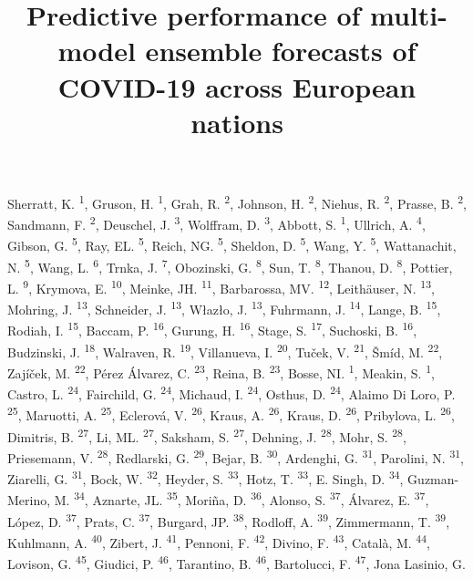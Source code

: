 \documentclass[
]{article}
\title{Predictive performance of multi-model ensemble forecasts of COVID-19 across European nations}
\author{}
\date{\vspace{-2.5em}}
\begin{document}
\maketitle

Sherratt, K. \textsuperscript{1}, Gruson, H. \textsuperscript{1}, Grah, R. \textsuperscript{2}, Johnson, H. \textsuperscript{2}, Niehus, R. \textsuperscript{2}, Prasse, B. \textsuperscript{2}, Sandmann, F. \textsuperscript{2}, Deuschel, J. \textsuperscript{3}, Wolffram, D. \textsuperscript{3}, Abbott, S. \textsuperscript{1}, Ullrich, A. \textsuperscript{4}, Gibson, G. \textsuperscript{5}, Ray, EL. \textsuperscript{5}, Reich, NG. \textsuperscript{5}, Sheldon, D. \textsuperscript{5}, Wang, Y. \textsuperscript{5}, Wattanachit, N. \textsuperscript{5}, Wang, L. \textsuperscript{6}, Trnka, J. \textsuperscript{7}, Obozinski, G. \textsuperscript{8}, Sun, T. \textsuperscript{8}, Thanou, D. \textsuperscript{8}, Pottier, L. \textsuperscript{9}, Krymova, E. \textsuperscript{10}, Meinke, JH. \textsuperscript{11}, Barbarossa, MV. \textsuperscript{12}, Leithäuser, N. \textsuperscript{13}, Mohring, J. \textsuperscript{13}, Schneider, J. \textsuperscript{13}, Włazło, J. \textsuperscript{13}, Fuhrmann, J. \textsuperscript{14}, Lange, B. \textsuperscript{15}, Rodiah, I. \textsuperscript{15}, Baccam, P. \textsuperscript{16}, Gurung, H. \textsuperscript{16}, Stage, S. \textsuperscript{17}, Suchoski, B. \textsuperscript{16}, Budzinski, J. \textsuperscript{18}, Walraven, R. \textsuperscript{19}, Villanueva, I. \textsuperscript{20}, Tuček, V. \textsuperscript{21}, Šmíd, M. \textsuperscript{22}, Zajíček, M. \textsuperscript{22}, Pérez Álvarez, C. \textsuperscript{23}, Reina, B. \textsuperscript{23}, Bosse, NI. \textsuperscript{1}, Meakin, S. \textsuperscript{1}, Castro, L. \textsuperscript{24}, Fairchild, G. \textsuperscript{24}, Michaud, I. \textsuperscript{24}, Osthus, D. \textsuperscript{24}, Alaimo Di Loro, P. \textsuperscript{25}, Maruotti, A. \textsuperscript{25}, Eclerová, V. \textsuperscript{26}, Kraus, A. \textsuperscript{26}, Kraus, D. \textsuperscript{26}, Pribylova, L. \textsuperscript{26}, Dimitris, B. \textsuperscript{27}, Li, ML. \textsuperscript{27}, Saksham, S. \textsuperscript{27}, Dehning, J. \textsuperscript{28}, Mohr, S. \textsuperscript{28}, Priesemann, V. \textsuperscript{28}, Redlarski, G. \textsuperscript{29}, Bejar, B. \textsuperscript{30}, Ardenghi, G. \textsuperscript{31}, Parolini, N. \textsuperscript{31}, Ziarelli, G. \textsuperscript{31}, Bock, W. \textsuperscript{32}, Heyder, S. \textsuperscript{33}, Hotz, T. \textsuperscript{33}, E. Singh, D. \textsuperscript{34}, Guzman-Merino, M. \textsuperscript{34}, Aznarte, JL. \textsuperscript{35}, Moriña, D. \textsuperscript{36}, Alonso, S. \textsuperscript{37}, Álvarez, E. \textsuperscript{37}, López, D. \textsuperscript{37}, Prats, C. \textsuperscript{37}, Burgard, JP. \textsuperscript{38}, Rodloff, A. \textsuperscript{39}, Zimmermann, T. \textsuperscript{39}, Kuhlmann, A. \textsuperscript{40}, Zibert, J. \textsuperscript{41}, Pennoni, F. \textsuperscript{42}, Divino, F. \textsuperscript{43}, Català, M. \textsuperscript{44}, Lovison, G. \textsuperscript{45}, Giudici, P. \textsuperscript{46}, Tarantino, B. \textsuperscript{46}, Bartolucci, F. \textsuperscript{47}, Jona Lasinio, G. 
\end{document}
